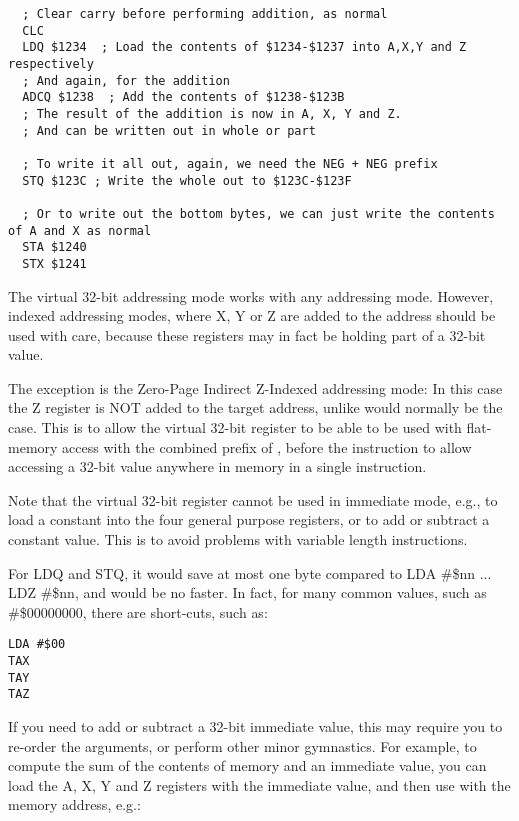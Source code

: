 \begin{tcolorbox}[colback=black,coltext=white]
\verbatimfont{\codefont}
\begin{verbatim}
  ; Clear carry before performing addition, as normal
  CLC
  LDQ $1234  ; Load the contents of $1234-$1237 into A,X,Y and Z respectively
  ; And again, for the addition
  ADCQ $1238  ; Add the contents of $1238-$123B
  ; The result of the addition is now in A, X, Y and Z.
  ; And can be written out in whole or part

  ; To write it all out, again, we need the NEG + NEG prefix
  STQ $123C ; Write the whole out to $123C-$123F

  ; Or to write out the bottom bytes, we can just write the contents of A and X as normal
  STA $1240
  STX $1241
\end{verbatim}
\end{tcolorbox}

The virtual 32-bit addressing mode works with any addressing mode.
However, indexed addressing modes, where X, Y or Z are added to the address should
be used with care, because these registers may in fact be holding part of a 32-bit value.

The exception is the Zero-Page
Indirect Z-Indexed addressing mode: In this case the Z register is NOT added to the target address, unlike would normally
be the case. This is to allow the virtual 32-bit register to be able to be used with flat-memory access with the combined prefix of
,  before the instruction to allow accessing a 32-bit value anywhere in memory in a single instruction.

Note that the virtual 32-bit register cannot be used in immediate mode, e.g., to load a constant into the four general
purpose registers, or to add or subtract a constant value.  This is to
avoid problems with variable length instructions.

For LDQ and STQ, it would save at most one byte
compared to LDA \#\$nn ... LDZ \#\$nn, and would be no faster.  In fact, for many common
values, such as \#\$00000000, there are short-cuts, such as:

\begin{tcolorbox}[colback=black,coltext=white]
\verbatimfont{\codefont}
\begin{verbatim}
LDA #$00
TAX
TAY
TAZ
\end{verbatim}
\end{tcolorbox}

If you need to add or subtract a 32-bit immediate value, this may require you to re-order the arguments, or perform other
minor gymnastics.  For example, to compute the sum of the contents of memory and an immediate value, you can load the A, X, Y
and Z registers with the immediate value, and then use  with the memory address, e.g.:

